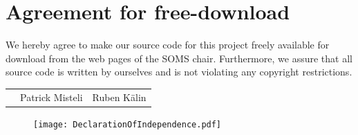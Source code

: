 \documentclass[11pt]{article}
\begin{document}
\graphicspath{{Images/}}


\newpage


\newpage
\section*{Agreement for free-download}
\bigskip


\bigskip


\large We hereby agree to make our source code for this project freely available for download from the web pages of the SOMS chair. Furthermore, we assure that all source code is written by ourselves and is not violating any copyright restrictions.

\begin{center}

\bigskip


\bigskip


\begin{tabular}{@{}p{3.3cm}@{}p{6cm}@{}@{}p{6cm}@{}}
\begin{minipage}{3cm}

\end{minipage}
&
\begin{minipage}{6cm}
\vspace{2mm} \large Patrick Misteli

 \vspace{\baselineskip}

\end{minipage}
&
\begin{minipage}{6cm}

\large Ruben K{\"a}lin

\end{minipage}
\end{tabular}


\end{center}
\newpage

\thispagestyle{empty}
\begin{figure}
\vspace*{-2cm}
\centering
\texttt{[image: DeclarationOfIndependence.pdf]}
\end{figure}
\end{document}
